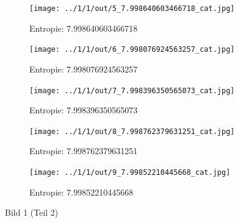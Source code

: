 \begin{figure}
	\centering

	\begin{subfigure}{0.25\textwidth}
		\texttt{[image: ../1/1/out/5\_7.998640603466718\_cat.jpg]}
		\caption{Entropie: 7.998640603466718}
	\end{subfigure}

	\begin{subfigure}{0.25\textwidth}
		\texttt{[image: ../1/1/out/6\_7.998076924563257\_cat.jpg]}
		\caption{Entropie: 7.998076924563257}
	\end{subfigure}

	\begin{subfigure}{0.25\textwidth}
		\texttt{[image: ../1/1/out/7\_7.998396350565073\_cat.jpg]}
		\caption{Entropie: 7.998396350565073}
	\end{subfigure}

	\begin{subfigure}{0.25\textwidth}
		\texttt{[image: ../1/1/out/8\_7.998762379631251\_cat.jpg]}
		\caption{Entropie: 7.998762379631251}
	\end{subfigure}

	\begin{subfigure}{0.25\textwidth}
		\texttt{[image: ../1/1/out/9\_7.99852210445668\_cat.jpg]}
		\caption{Entropie: 7.99852210445668}
	\end{subfigure}

	\caption{Bild 1 (Teil 2)}
\end{figure}

